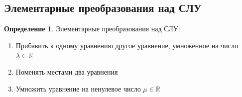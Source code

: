 \documentclass[a4paper, 12pt]{article}
\newcommand{\R}{\mathbb R}
\theoremstyle{definition}
\newtheorem*{definition}{Определение}
\begin{document}
    \subsection{Элементарные преобразования над СЛУ}
    \begin{definition}
      Элементарные преобразования над СЛУ:
      \begin{enumerate}
        \item Прибавить к одному уравнению другое уравнение, умноженное на число $\lambda \in \R$
        \item Поменять местами два уравнения
        \item Умножить уравнение на ненулевое число $\mu \in \R$
      \end{enumerate}
    \end{definition} 
    
\end{document}
